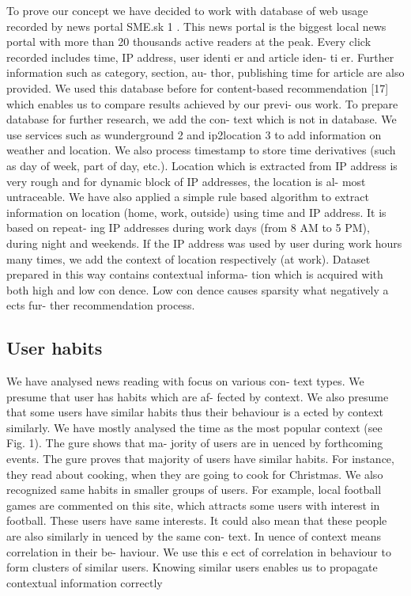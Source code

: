 \documentclass[10pt]{extarticle}
\begin{document}
\begin{multicols}{2}
To prove our concept we have decided to work with database
of web usage recorded by news portal SME.sk
1
.  This news
portal  is  the  biggest  local  news  portal  with  more  than  20
thousands active readers at the peak.  Every click recorded
includes  time,  IP  address,  user  identi er  and  article  iden-
ti er.   Further  information  such  as  category,  section,  au-
thor, publishing time for article are also provided.  We used
this database before for content-based recommendation [17]
which enables us to compare results achieved by our previ-
ous work.
To prepare database for further research, we add the con-
text  which  is  not  in  database.    We  use  services  such  as
wunderground
2
and
ip2location
3
to  add  information  on
weather and location.  We also process timestamp to store
time  derivatives  (such  as  day  of  week,  part  of  day,  etc.).
Location which is extracted from IP address is very rough
and  for  dynamic  block  of  IP  addresses,  the  location  is  al-
most untraceable.  We have also applied a simple rule based
algorithm to extract information on location (home, work,
outside) using time and IP address.  It is based on repeat-
ing IP addresses during work days (from 8 AM to 5 PM),
during night and weekends.  If the IP address was used by
user during work hours many times, we add the context of
location respectively (at work).
Dataset prepared in this way contains contextual informa-
tion which is acquired with both high and low con dence.
Low con dence causes sparsity what negatively a ects fur-
ther recommendation process.

\subsection{User habits}

We have analysed news reading with focus on various con-
text types.  We presume that user has habits which are af-
fected by context.  We also presume that some users have
similar  habits  thus  their  behaviour  is  a ected  by  context
similarly.   We  have  mostly  analysed  the  time  as  the  most
popular  context  (see  Fig.   1).   The   gure  shows  that  ma-
jority  of  users  are  in uenced  by  forthcoming  events.   The
 gure proves that majority of users have similar habits.  For
instance, they read about cooking, when they are going to
cook for Christmas.
We also recognized same habits in smaller groups of users.
For  example,  local  football  games  are  commented  on  this
site,  which  attracts  some  users  with  interest  in  football.
These  users  have  same  interests.   It  could  also  mean  that
these people are also similarly in uenced by the same con-
text.   In uence  of  context  means  correlation  in  their  be-
haviour.   We  use  this  e ect  of  correlation  in  behaviour  to
form clusters of similar users.  Knowing similar users enables
us to propagate contextual information correctly


\end{multicols}
\end{document}
